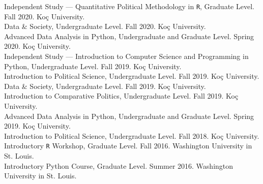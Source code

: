 \documentclass[12pt]{article}
\begin{document}
\begin{minipage}[t]{.65\textwidth}
\FlushLeft
Independent Study --- Quantitative Political Methodology in \texttt{R}, Graduate Level. Fall 2020. Ko\c{c} University.\\
\vspace{.5cm}
Data \& Society, Undergraduate Level. Fall 2020. Ko\c{c} University.\\
\vspace{.5cm}
Advanced Data Analysis in Python, Undergraduate and Graduate Level. Spring 2020. Ko\c{c} University.\\
\vspace{.5cm}
Independent Study --- Introduction to Computer Science and Programming in Python, Undergraduate Level. Fall 2019. Ko\c{c} University.\\
\vspace{.5cm}
Introduction to Political Science, Undergraduate Level. Fall 2019. Ko\c{c} University.\\
\vspace{.5cm}
Data \& Society, Undergraduate Level. Fall 2019. Ko\c{c} University.\\
\vspace{.5cm}
Introduction to Comparative Politics, Undergraduate Level. Fall 2019. Ko\c{c} University.\\
\vspace{.5cm}
\FlushLeft Advanced Data Analysis in Python, Undergraduate and Graduate Level. Spring 2019. Ko\c{c} University.\\
\vspace{.5cm}
Introduction to Political Science, Undergraduate Level. Fall 2018. Ko\c{c} University.\\
\vspace{.5cm}
Introductory \texttt{R} Workshop, Graduate Level. Fall 2016. Washington University in St. Louis.\\
\vspace{.5cm}
Introductory Python Course, Graduate Level. Summer 2016. Washington University in St. Louis.
\end{minipage}
\vspace{.5cm}
\end{document}
